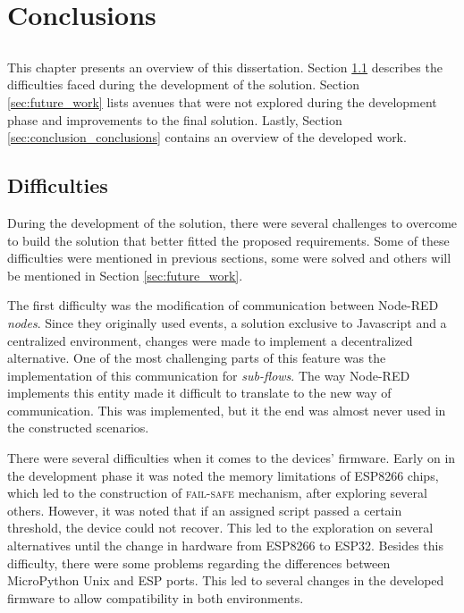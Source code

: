 \chapter{Conclusions} \label{chap:concl}

\section*{}

\minitoc \mtcskip \noindent
This chapter presents an overview of this dissertation. Section \ref{sec:difficulties} describes the difficulties faced during the development of the solution. Section \ref{sec:future_work} lists avenues that were not explored during the development phase and improvements to the final solution. Lastly, Section \ref{sec:conclusion_conclusions} contains an overview of the developed work.

\section{Difficulties}\label{sec:difficulties}

During the development of the solution, there were several challenges to overcome to build the solution that better fitted the proposed requirements. Some of these difficulties were mentioned in previous sections, some were solved and others will be mentioned in Section \ref{sec:future_work}.

The first difficulty was the modification of communication between Node-RED \textit{nodes}. Since they originally used events, a solution exclusive to Javascript and a centralized environment, changes were made to implement a decentralized alternative. One of the most challenging parts of this feature was the implementation of this communication for \emph{sub-flows}. The way Node-RED implements this entity made it difficult to translate to the new way of communication. This was implemented, but it the end was almost never used in the constructed scenarios.

There were several difficulties when it comes to the devices' firmware. Early on in the development phase it was noted the memory limitations of ESP8266 chips, which led to the construction of \textsc{fail-safe} mechanism, after exploring several others. However, it was noted that if an assigned script passed a certain threshold, the device could not recover. This led to the exploration on several alternatives until the change in hardware from ESP8266 to ESP32. Besides this difficulty, there were some problems regarding the differences between MicroPython Unix and ESP ports. This led to several changes in the developed firmware to allow compatibility in both environments. 

